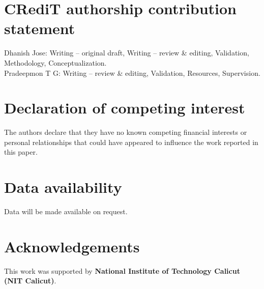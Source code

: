 \documentclass[12pt]{article}
\begin{document}
	\section*{CRediT authorship contribution statement}
	Dhanish Jose: Writing – original draft, Writing – review \& editing, Validation, Methodology, Conceptualization.\\
	Pradeepmon T G: Writing – review \& editing, Validation, Resources, Supervision.
	
	
	\section*{Declaration of competing interest}
	The authors declare that they have no known competing financial interests or personal relationships 
	that could have appeared to influence the work reported in this paper.
	
	\section*{Data availability}
	Data will be made available on request.
	
	\section*{Acknowledgements}
	This work was supported by \textbf{National Institute of Technology Calicut (NIT Calicut)}.
	
	
	\appendix
	

	
	
	\clearpage

	
\end{document}
